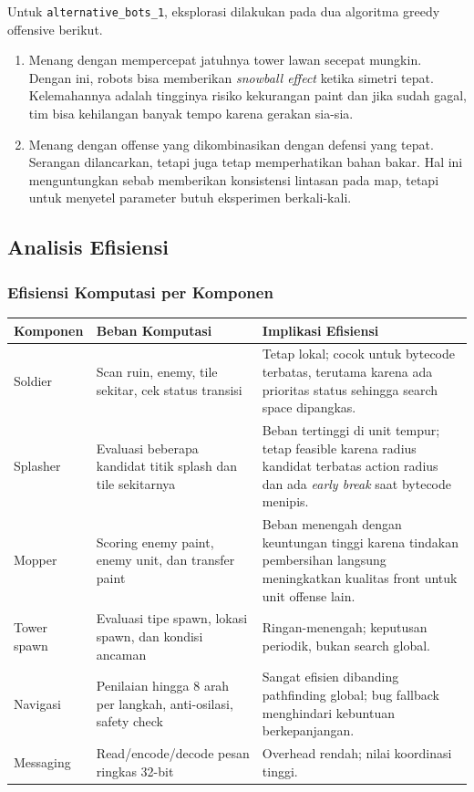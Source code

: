 Untuk \texttt{alternative\_bots\_1}, eksplorasi dilakukan pada dua algoritma greedy offensive berikut.
\begin{enumerate}
    \item Menang dengan mempercepat jatuhnya tower lawan secepat mungkin. Dengan ini, robots bisa memberikan \textit{snowball effect} ketika simetri tepat. Kelemahannya adalah tingginya risiko kekurangan paint dan jika sudah gagal, tim bisa kehilangan banyak tempo karena gerakan sia-sia.
    \item Menang dengan offense yang dikombinasikan dengan defensi yang tepat. Serangan dilancarkan, tetapi juga tetap memperhatikan bahan bakar. Hal ini menguntungkan sebab memberikan konsistensi lintasan pada map, tetapi untuk menyetel parameter butuh eksperimen berkali-kali.
\end{enumerate}

\subsection{Analisis Efisiensi}

\subsubsection{Efisiensi Komputasi per Komponen}
\begin{longtable}{>{\raggedright\arraybackslash}p{} >{\raggedright\arraybackslash}p{} >{\raggedright\arraybackslash}p{}}
    \toprule
    \textbf{Komponen} & \textbf{Beban Komputasi}                                        & \textbf{Implikasi Efisiensi}                                                                                                                     \\
    \midrule
    \endhead
    Soldier           & Scan ruin, enemy, tile sekitar, cek status transisi             & Tetap lokal; cocok untuk bytecode terbatas, terutama karena ada prioritas status sehingga search space dipangkas.                                \\
    Splasher          & Evaluasi beberapa kandidat titik splash dan tile sekitarnya     & Beban tertinggi di unit tempur; tetap feasible karena radius kandidat terbatas action radius dan ada \textit{early break} saat bytecode menipis. \\
    Mopper            & Scoring enemy paint, enemy unit, dan transfer paint             & Beban menengah dengan keuntungan tinggi karena tindakan pembersihan langsung meningkatkan kualitas front untuk unit offense lain. \\
    Tower spawn       & Evaluasi tipe spawn, lokasi spawn, dan kondisi ancaman          & Ringan-menengah; keputusan periodik, bukan search global. \\
    Navigasi          & Penilaian hingga 8 arah per langkah, anti-osilasi, safety check & Sangat efisien dibanding pathfinding global; bug fallback menghindari kebuntuan berkepanjangan. \\
    Messaging         & Read/encode/decode pesan ringkas 32-bit                         & Overhead rendah; nilai koordinasi tinggi.\\
    \bottomrule
\end{longtable}

